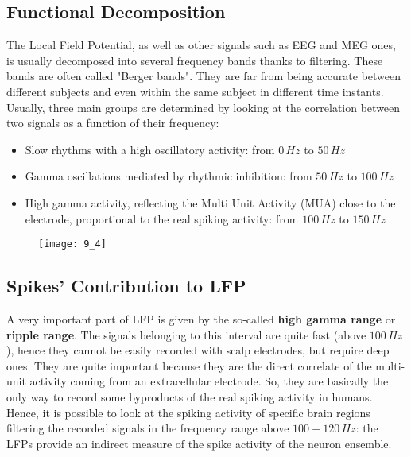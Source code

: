 \subsection{Functional Decomposition}
The Local Field Potential, as well as other signals such as EEG and MEG ones,
is usually decomposed into several frequency bands thanks to filtering.
These bands are often called "Berger bands". They are far from being accurate 
between different subjects and even within the same subject in
different time instants. \\
Usually, three main groups are determined by looking at the correlation between 
two signals as a function of their frequency:
\begin{itemize}
    \item Slow rhythms with a high oscillatory activity: from \(0\,Hz\) to \(50\,Hz\)
    \item Gamma oscillations mediated by rhythmic inhibition: from \(50\,Hz\) to \(100\,Hz\)
    \item High gamma activity, reflecting the Multi Unit Activity (MUA) close
    to the electrode, proportional to the real spiking activity: from \(100\,Hz\) to \(150\,Hz\)
\end{itemize}
\begin{figure}[H]
    \texttt{[image: 9\_4]}
    \centering
\end{figure}

\newpage
\subsection{Spikes' Contribution to LFP}
A very important part of LFP is given by the so-called \textbf{high gamma range} or
\textbf{ripple range}. The signals belonging to this interval are quite fast 
(above \(100\,Hz\)), hence they cannot be easily recorded with scalp electrodes, but 
require deep ones. They are quite important because they are the direct correlate of 
the multi-unit activity coming from an extracellular electrode. So, they are basically 
the only way to record some byproducts of the real spiking activity in humans.\\
Hence, it is possible to look at the spiking activity of specific brain regions filtering 
the recorded signals in the frequency range above \(100-120\,Hz\): the LFPs provide an indirect 
measure of the spike activity of the neuron ensemble. 